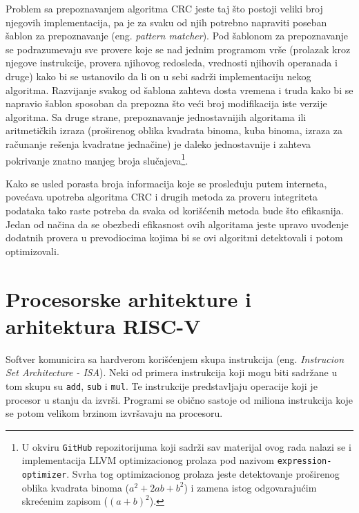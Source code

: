 \documentclass[12pt,oneside]{memoir}
\begin{document}
Problem sa prepoznavanjem algoritma CRC jeste taj što postoji veliki broj njegovih implementacija, pa je za svaku od njih potrebno napraviti poseban šablon za prepoznavanje (eng. \textit{pattern matcher}). Pod šablonom za prepoznavanje se podrazumevaju sve provere koje se nad jednim programom vrše (prolazak kroz njegove instrukcije, provera njihovog redosleda, vrednosti njihovih operanada i druge) kako bi se ustanovilo da li on u sebi sadrži implementaciju nekog algoritma. 
Razvijanje svakog od šablona zahteva dosta vremena i truda kako bi se napravio šablon sposoban da prepozna što veći broj modifikacija iste verzije algoritma. 
Sa druge strane, prepoznavanje jednostavnijih algoritama ili aritmetičkih izraza (proširenog oblika kvadrata binoma, kuba binoma, izraza za računanje rešenja kvadratne jednačine) je daleko jednostavnije i zahteva pokrivanje znatno manjeg broja slučajeva\footnote{U okviru \texttt{GitHub} repozitorijuma koji sadrži sav materijal ovog rada nalazi se i implementacija LLVM optimizacionog prolaza pod nazivom \texttt{expression-optimizer}. Svrha tog optimizacionog prolaza jeste detektovanje proširenog oblika kvadrata binoma ($a^2 + 2ab + b^2$) i zamena istog odgovarajućim skrećenim zapisom ($(a + b)^2$).}.
 

Kako se usled porasta broja informacija koje se prosleđuju putem interneta, povećava upotreba algoritma CRC i drugih metoda za proveru integriteta podataka tako raste potreba da svaka od korišćenih metoda bude što efikasnija. Jedan od načina da se obezbedi efikasnost ovih algoritama jeste upravo uvođenje dodatnih provera u prevodiocima kojima bi se ovi algoritmi detektovali i potom optimizovali.



\chapter{Procesorske arhitekture i arhitektura RISC-V}
\label{chap:riscv}
Softver komunicira sa hardverom korišćenjem skupa instrukcija (eng. \textit{Instrucion Set Architecture - ISA}). Neki od primera instrukcija koji mogu biti sadržane u tom skupu su \texttt{add}, \texttt{sub} i \texttt{mul}. Te instrukcije predstavljaju operacije koji je procesor u stanju da izvrši. Programi se obično sastoje od miliona instrukcija koje se potom velikom brzinom izvršavaju na procesoru. 
\end{document}
